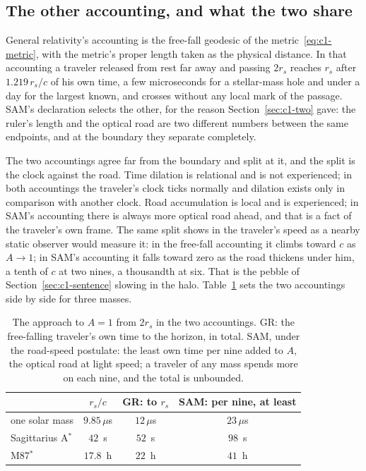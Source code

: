 \subsection{The other accounting, and what the two share}

General relativity's accounting is the free-fall geodesic of the metric~\eqref{eq:c1-metric}, with the metric's proper length taken as the physical distance. In that accounting a traveler released from rest far away and passing $2r_s$ reaches $r_s$ after $1.219\,r_s/c$ of his own time, a few microseconds for a stellar-mass hole and under a day for the largest known, and crosses without any local mark of the passage. SAM's declaration selects the other, for the reason Section~\ref{sec:c1-two} gave: the ruler's length and the optical road are two different numbers between the same endpoints, and at the boundary they separate completely.

The two accountings agree far from the boundary and split at it, and the split is the clock against the road. Time dilation is relational and is not experienced; in both accountings the traveler's clock ticks normally and dilation exists only in comparison with another clock. Road accumulation is local and is experienced; in SAM's accounting there is always more optical road ahead, and that is a fact of the traveler's own frame. The same split shows in the traveler's speed as a nearby static observer would measure it: in the free-fall accounting it climbs toward $c$ as $A\to1$; in SAM's accounting it falls toward zero as the road thickens under him, a tenth of $c$ at two nines, a thousandth at six. That is the pebble of Section~\ref{sec:c1-sentence} slowing in the halo. Table~\ref{tab:c1-approach} sets the two accountings side by side for three masses.

\begin{table}[t]
\centering\small
\caption{The approach to $A=1$ from $2r_s$ in the two accountings. GR: the free-falling traveler's own time to the horizon, in total. SAM, under the road-speed postulate: the least own time per nine added to $A$, the optical road at light speed; a traveler of any mass spends more on each nine, and the total is unbounded.}
\label{tab:c1-approach}
\begin{tabular}{@{}lccc@{}}
\toprule
 & $r_s/c$ & GR: to $r_s$ & SAM: per nine, at least \\
\midrule
one solar mass & $9.85\,\mu$s & $12\,\mu$s & $23\,\mu$s \\
Sagittarius A$^*$ & $42$~s & $52$~s & $98$~s \\
M87$^*$ & $17.8$~h & $22$~h & $41$~h \\
\bottomrule
\end{tabular}
\end{table}


